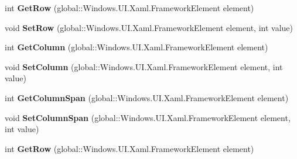 \begin{DoxyCompactItemize}
\item 
\mbox{\label{interface_windows_1_1_u_i_1_1_xaml_1_1_controls_1_1_i_grid_statics_a7cab98248e8823c599dc35102ff746c5}} 
int {\bfseries Get\+Row} (global\+::\+Windows.\+U\+I.\+Xaml.\+Framework\+Element element)
\item 
\mbox{\label{interface_windows_1_1_u_i_1_1_xaml_1_1_controls_1_1_i_grid_statics_a74203a6ea6e2a26830dd353da361789f}} 
void {\bfseries Set\+Row} (global\+::\+Windows.\+U\+I.\+Xaml.\+Framework\+Element element, int value)
\item 
\mbox{\label{interface_windows_1_1_u_i_1_1_xaml_1_1_controls_1_1_i_grid_statics_a5669711d053518b49290b7556a8ba584}} 
int {\bfseries Get\+Column} (global\+::\+Windows.\+U\+I.\+Xaml.\+Framework\+Element element)
\item 
\mbox{\label{interface_windows_1_1_u_i_1_1_xaml_1_1_controls_1_1_i_grid_statics_a73679f372e5c95be6df634924e36dc2c}} 
void {\bfseries Set\+Column} (global\+::\+Windows.\+U\+I.\+Xaml.\+Framework\+Element element, int value)
\item 
\mbox{\label{interface_windows_1_1_u_i_1_1_xaml_1_1_controls_1_1_i_grid_statics_aeb5b4c961c8bdfd7fb2625d5ae893664}} 
int {\bfseries Get\+Column\+Span} (global\+::\+Windows.\+U\+I.\+Xaml.\+Framework\+Element element)
\item 
\mbox{\label{interface_windows_1_1_u_i_1_1_xaml_1_1_controls_1_1_i_grid_statics_ac9860a85b2ffd6bee23d564be6744824}} 
void {\bfseries Set\+Column\+Span} (global\+::\+Windows.\+U\+I.\+Xaml.\+Framework\+Element element, int value)
\item 
\mbox{\label{interface_windows_1_1_u_i_1_1_xaml_1_1_controls_1_1_i_grid_statics_a7cab98248e8823c599dc35102ff746c5}} 
int {\bfseries Get\+Row} (global\+::\+Windows.\+U\+I.\+Xaml.\+Framework\+Element element)

\end{DoxyCompactItemize}
